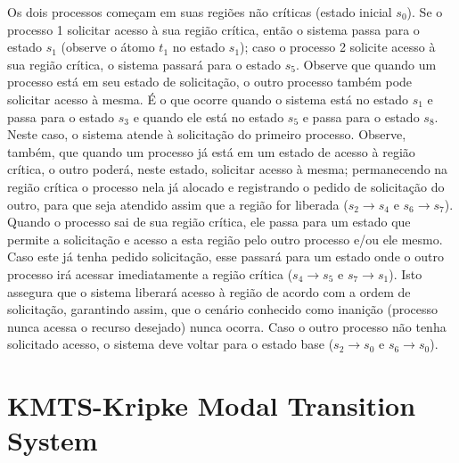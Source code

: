 \documentclass[normaltoc,capchap,capsec,times]{abnt}
\begin{document}
Os dois processos começam em suas regiões não críticas (estado inicial $s_0$). Se o processo 1 solicitar acesso à sua região crítica, então o sistema passa para o estado $s_1$ (observe o átomo $t_1$ no estado $s_1$); caso o processo 2 solicite acesso à sua região crítica, o sistema passará para o estado $s_5$. Observe que quando um processo está em seu estado de solicitação, o outro processo também pode solicitar acesso à mesma. É o que ocorre quando o sistema está no estado $s_1$ e passa para o estado $s_3$ e quando ele está no estado $s_5$ e passa para o estado $s_8$. Neste caso, o sistema atende  à solicitação do primeiro processo. Observe, também, que quando um processo já está em um estado de acesso à região crítica, o outro poderá, neste estado, solicitar acesso à mesma; permanecendo na região crítica o processo nela já alocado e registrando o pedido de solicitação do outro, para que seja atendido assim que a região for liberada ($s_2 \to s_4$ e $s_6 \to s_7$). Quando o processo sai de sua região crítica, ele passa para um estado que permite a solicitação e acesso a esta região pelo outro processo e/ou ele mesmo. Caso este já tenha pedido solicitação, esse passará para um estado onde o outro processo irá acessar imediatamente a região crítica ($s_4\to s_5$ e $s_7 \to s_1$). Isto assegura que o sistema liberará acesso à região de acordo com a ordem de solicitação, garantindo assim, que o cenário conhecido como inanição (processo nunca acessa o recurso desejado) nunca ocorra. Caso o outro processo não tenha solicitado acesso, o sistema deve voltar para o estado base ($s_2 \to s_0$ e $s_6 \to s_0$).

%
%

\section{KMTS-Kripke Modal Transition System}\label{sec:kmts}
\end{document}
